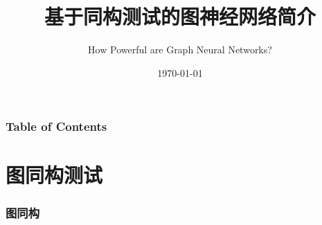 \documentclass{beamer}
\title %
{基于同构测试的图神经网络简介}
\author %
{How Powerful are Graph Neural Networks?}
\date %
{\today}
\begin{document}
\frame{\titlepage}


\begin{frame}
\frametitle{Table of Contents}
\tableofcontents
\end{frame}


\section{图同构测试}

\begin{frame}

  \frametitle{图同构}


\end{frame}
\end{document}
